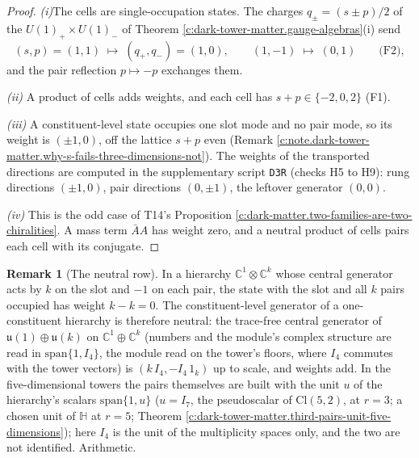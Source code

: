 \documentclass[11pt]{article}
\theoremstyle{definition}
\newtheorem{remark}[theorem]{Remark}
\theoremstyle{plain}
\newcommand{\changedmark}[2]{\marginpar{\raggedright\scriptsize\color{#1}#2}}
\providecommand{\C}{}\renewcommand{\C}{\mathbb{C}}
\providecommand{\Cl}{}\renewcommand{\Cl}{\mathrm{Cl}}
\providecommand{\HH}{}\renewcommand{\HH}{\mathbb{H}}
\providecommand{\uu}{}\renewcommand{\uu}{\mathfrak{u}}
\providecommand{\file}{}\renewcommand{\file}[1]{\texttt{#1}}
\begin{document}
\begin{proof}
\textit{(i)}\enspace The cells are single-occupation states. The charges $q_{\pm} = (s \pm p)/2$ of the $U(1)_{+} \times U(1)_{-}$ of Theorem \ref{c:dark-tower-matter.gauge-algebras}(i) send
\[
(s, p) = (1, 1) \;\mapsto\; (q_{+}, q_{-}) = (1, 0), \qquad (1, -1) \;\mapsto\; (0, 1) \qquad \text{(F2)},
\]
and the pair reflection $p \mapsto -p$ exchanges them.



\emph{(ii)}  A product of cells adds weights, and each cell has $s + p \in \{-2, 0, 2\}$ (F1).



\emph{(iii)}  A constituent-level state occupies one slot mode and no pair mode, so its weight is $(\pm 1, 0)$, off the lattice $s + p$ even (Remark \ref{c:note.dark-tower-matter.why-s-fails-three-dimensions-not}). The weights of the transported directions are computed in the supplementary script \file{D3R} (checks H5 to H9): rung directions $(\pm 1, 0)$, pair directions $(0, \pm 1)$, the leftover generator $(0,0)$.



\emph{(iv)}  This is the odd case of T14's Proposition \ref{c:dark-matter.two-families-are-two-chiralities}. A mass term $\bar{A}A$ has weight zero, and a neutral product of cells pairs each cell with its conjugate.

\end{proof}

\begin{remark}[The neutral row]\label{c:note.dark-tower-matter.neutral-row}
\changedmark{BurntOrange}{changed since the deposit}
In a hierarchy $\C^{1} \otimes \C^{k}$ whose central generator acts by $k$ on the slot and $-1$ on each pair, the state with the slot and all $k$ pairs occupied has weight $k - k = 0$. The constituent-level generator of a one-constituent hierarchy is therefore neutral: the trace-free central generator of $\uu(1) \oplus \uu(k)$ on $\C^{1} \oplus \C^{k}$ (numbers and the module's complex structure are read in $\mathrm{span}\{1, I_{4}\}$, the module read on the tower's floors, where $I_{4}$ commutes with the tower vectors) is $(k\,I_{4}, -I_{4}\,1_{k})$ up to scale, and weights add. In the five-dimensional towers the pairs themselves are built with the unit $u$ of the hierarchy's scalars $\mathrm{span}\{1, u\}$ ($u = I_{7}$, the pseudoscalar of $\Cl(5,2)$, at $r = 3$; a chosen unit of $\HH$ at $r = 5$; Theorem \ref{c:dark-tower-matter.third-pairs-unit-five-dimensions}); here $I_{4}$ is the unit of the multiplicity spaces only, and the two are not identified. Arithmetic.
\end{remark}
\end{document}
